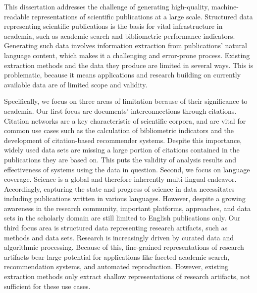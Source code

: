 \Abstract{}
This dissertation addresses the challenge of generating high-quality, machine-readable representations of scientific publications at a large scale.
Structured data representing scientific publications is the basis for vital infrastructure in academia, such as academic search and bibliometric performance indicators. %
Generating such data involves information extraction from publications' natural language content, which makes it a challenging and error-prone process.
Existing extraction methods and the data they produce are limited in several ways. %
This is problematic, because it means applications and research building on currently available data are of limited scope and validity.

Specifically,
we focus on three areas of limitation because of their significance to academia.
Our first focus are documents' interconnections through citations.
Citation networks are a key characteristic of scientific corpora, and are vital for common use cases such as the calculation of bibliometric indicators and the development of citation-based recommender systems. Despite this importance, widely used data sets %
are missing a large portion of citations contained in the publications they are based on.
This puts the validity of analysis results and effectiveness of systems using the data in question.
Second, we focus on language coverage.
Science is a global and therefore inherently multi-lingual endeavor. Accordingly, capturing the state and progress of science in data necessitates including publications written in various languages. However, despite a growing awareness in the
research community, important platforms, approaches, and data sets in the scholarly domain are still limited to English publications only. %
Our third focus area is structured data representing research artifacts, such as methods and data sets. Research is increasingly driven by curated data and algorithmic processing. Because of this, fine-grained representations of research artifacts bear large potential for applications like faceted academic search, recommendation systems, and automated reproduction. However, existing extraction methods only extract shallow representations of research artifacts, not sufficient for these use cases.

